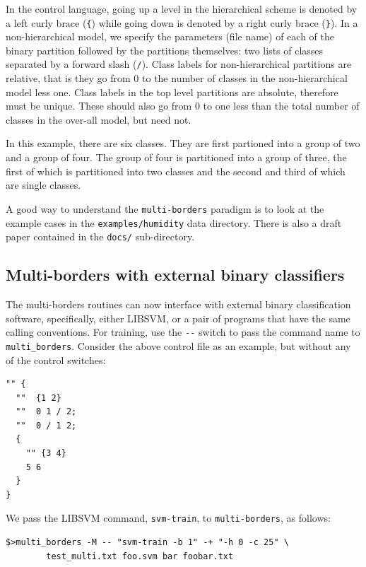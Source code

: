 \documentclass[12pt]{article}
\begin{document}
  In the control language, going up a level in the hierarchical scheme is denoted by a left curly brace (\verb'{') while going down is denoted by a right curly brace (\verb$}$).  In a non-hierarchical model, we specify the parameters (file name) of each of the binary partition followed by the partitions themselves: two lists of classes separated by a forward slash (\verb'/').  Class labels for non-hierarchical partitions are relative, that is they go from 0 to the number of classes in the non-hierarchical model less one.  Class labels in the top level partitions are absolute, therefore must be unique.  These should also go from 0 to one less than the total number of classes in the over-all model, but need not.

  In this example, there are six classes.  They are first partioned into a group of two and a group of four.  The group of four is partitioned into a group of three, the first of which is partitioned into two classes and the second and third of which are single classes.  

A good way to understand the \verb"multi-borders" paradigm is to look at the example cases in the \verb"examples/humidity" data directory.  There is also a draft paper contained in the \verb"docs/" sub-directory.


\subsection{Multi-borders with external binary classifiers}

The multi-borders routines can now interface with external binary classification software, specifically, either LIBSVM, or a pair of programs that have the same calling conventions.  For training, use the \verb"--" switch to pass the command name to \verb/multi_borders/.  Consider the above control file as an example, but without any of the control switches:

\begin{verbatim}
"" {
  ""  {1 2}
  ""  0 1 / 2;
  ""  0 / 1 2;
  {
    "" {3 4}
    5 6
  } 
} 
\end{verbatim}

We pass the LIBSVM command, \verb"svm-train", to \verb"multi-borders", as follows:

\begin{verbatim}
$>multi_borders -M -- "svm-train -b 1" -+ "-h 0 -c 25" \
		test_multi.txt foo.svm bar foobar.txt
\end{verbatim}
\end{document}
